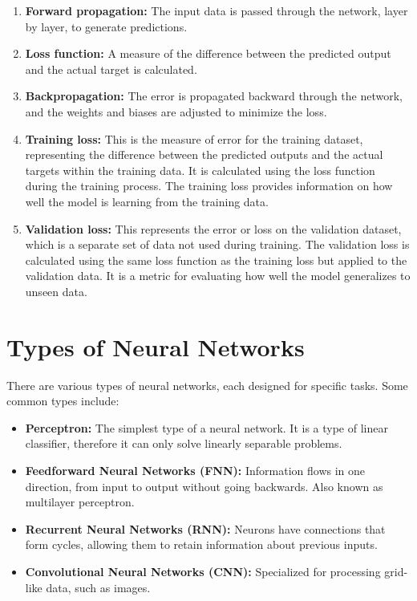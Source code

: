 \documentclass[english, ba, kiv, he, iso690numb, pdf, viewonly]{fasthesis}
\begin{document}
\begin{enumerate}
    \item \textbf{Forward propagation:} The input data is passed through the network, layer by layer, to generate predictions.
    
    \item \textbf{Loss function:} A measure of the difference between the predicted output and the actual target is calculated.
    
    \item \textbf{Backpropagation:} The error is propagated backward through the network, and the weights and biases are adjusted to minimize the loss.

    \item \textbf{Training loss:} This is the measure of error for the training dataset, representing the difference between the predicted outputs and the actual targets within the training data. It is calculated using the loss function during the training process. The training loss provides information on how well the model is learning from the training data.

    \item \textbf{Validation loss:} This represents the error or loss on the validation dataset, which is a separate set of data not used during training. The validation loss is calculated using the same loss function as the training loss but applied to the validation data. It is a metric for evaluating how well the model generalizes to unseen data.
\end{enumerate}

\section{Types of Neural Networks}

There are various types of neural networks, each designed for specific tasks. Some common types include:

\begin{itemize}
    \item \textbf{Perceptron:} The simplest type of a neural network. It is a type of linear classifier, therefore it can only solve linearly separable problems.

    \item \textbf{Feedforward Neural Networks (FNN):} Information flows in one direction, from input to output without going backwards. Also known as multilayer perceptron.
    
    \item \textbf{Recurrent Neural Networks (RNN):} Neurons have connections that form cycles, allowing them to retain information about previous inputs.
    
    \item \textbf{Convolutional Neural Networks (CNN):} Specialized for processing grid-like data, such as images.
\end{itemize}
%
%
%
%
\end{document}
